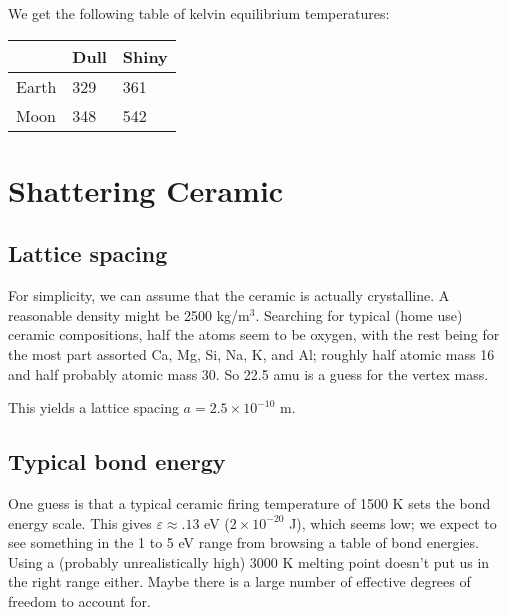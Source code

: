 \documentclass[12pt]{article}
\begin{document}
We get the following table of kelvin equilibrium temperatures:

\begin{center}

\begin{tabular}{|l|l|l|}

\hline

\,& Dull & Shiny \\ \hline
Earth &  329 & 361\\ \hline
Moon &  348  & 542\\ \hline


\end{tabular}

\end{center}

\section{}

\section{Shattering Ceramic}

\subsection{Lattice spacing}

For simplicity, we can assume that the ceramic is actually crystalline. A reasonable density might be 2500 kg/m\(^3\). Searching for typical (home use) ceramic compositions, half the atoms seem to be oxygen, with the rest being for the most part assorted Ca, Mg, Si, Na, K, and Al; roughly half atomic mass 16 and half probably atomic mass 30. So 22.5 amu is a guess for the vertex mass.

This yields a lattice spacing \(a = 2.5 \times 10^{-10}\) m.


\subsection{Typical bond energy}

One guess is that a typical ceramic firing temperature of 1500 K sets the bond energy scale. This gives \(\varepsilon \approx .13\) eV (\(2\times 10^{-20}\) J), which seems low; we expect to see something in the 1 to 5 eV range from browsing a table of bond energies. Using a (probably unrealistically high) 3000 K melting point doesn't put us in the right range either. Maybe there is a large number of effective degrees of freedom to account for.
\end{document}
